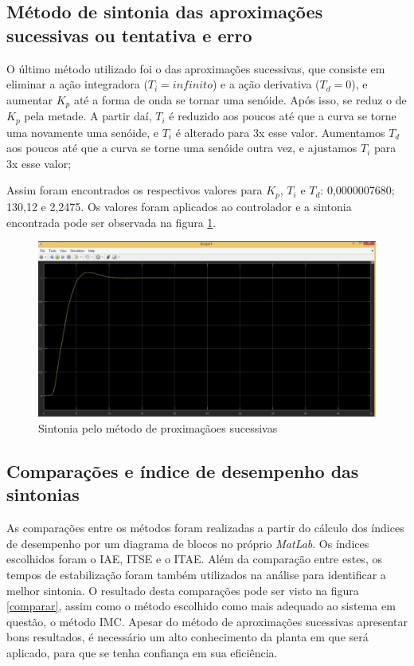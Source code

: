 \documentclass[article,12pt,oneside,a4paper,english,brazil,sumario=tradicional]{abntex2}
\begin{document}
\subsection{\large Método de sintonia das aproximações sucessivas ou tentativa e erro}

O último método utilizado foi o das aproximações sucessivas, que consiste em eliminar a ação integradora ($T_{i}=infinito$) e a ação derivativa ($T_{d}=0$), e aumentar $K_{p}$  até a forma de onda se tornar uma senóide. Após isso, se reduz o de $K_{p}$ pela metade. A partir daí, $T_{i}$ é reduzido aos poucos até que a curva se torne uma novamente uma senóide, e $T_{i}$ é alterado para 3x esse valor. Aumentamos $T_{d}$ aos poucos até que a curva se torne uma senóide outra vez, e ajustamos $T_{i}$ para 3x esse valor;


Assim foram encontrados os respectivos valores para $K_p$, $T_i$ e $T_d$: 0,0000007680; 130,12 e 2,2475. Os valores foram aplicados ao controlador e a sintonia encontrada pode ser observada na figura \ref{ap}.
\begin{figure}[H]
    \centering
    \includegraphics[scale=0.35]{ap.jpg}
    \caption{Sintonia pelo método de proximaçãoes sucessivas}
    \label{ap}
\end{figure}


\subsection{\large Comparações e índice de desempenho das sintonias}

As comparações entre os métodos foram realizadas a partir do cálculo dos índices de desempenho por um diagrama de blocos no próprio \textit{MatLab}. Os índices escolhidos foram o IAE, ITSE e o ITAE. Além da comparação entre estes, os tempos de estabilização foram também utilizados na análise para identificar a melhor sintonia.
O resultado desta comparações pode ser visto na figura \ref{comparar}, assim como o método escolhido como mais adequado ao sistema em questão, o método IMC. Apesar do método de aproximações sucessivas apresentar bons resultados, é necessário um alto conhecimento da planta em que será aplicado, para que se tenha confiança em sua eficiência.
\end{document}
